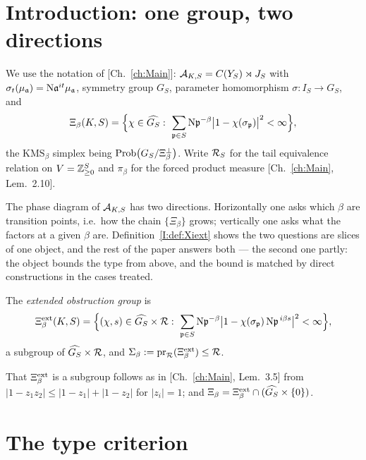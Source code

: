\section{Introduction: one group, two directions}

We use the notation of [Ch.~\ref{ch:Main}]: $\mathcal{A}_{K,S}=C(Y_S)\rtimes J_S$ with
$\sigma_t(\mu_{\mathfrak{a}})=\mathrm{N}\mathfrak{a}^{it}\mu_{\mathfrak{a}}$, symmetry group $G_S$, parameter homomorphism
$\sigma:I_S\to G_S$, and
\begin{equation}\label{I:eq:Xi}
\Xi_\beta(K,S)=\Bigl\{\chi\in\widehat{G_S}:\ \sum_{\mathfrak{p}\in S}\mathrm{N}\mathfrak{p}^{-\beta}\bigl|1-\chi(\sigma_{\mathfrak{p}})\bigr|^2<\infty\Bigr\},
\end{equation}
the $\mathrm{KMS}_\beta$ simplex being $\mathrm{Prob}\bigl(G_S/\Xi_\beta^\perp\bigr)$. Write
$\mathcal{R}_S$ for the tail equivalence relation on $V=\mathbb{Z}_{\ge0}^S$ and $\pi_\beta$ for the forced
product measure [Ch.~\ref{ch:Main}, Lem.~2.10].

The phase diagram of $\mathcal{A}_{K,S}$ has two directions. Horizontally one asks which
$\beta$ are transition points, i.e.\ how the chain $\{\Xi_\beta\}$ grows; vertically one asks
what the factors at a given $\beta$ are. Definition~\ref{I:def:Xiext} shows the two questions
are slices of one object, and the rest of the paper answers both --- the second one
partly: the object bounds the type from above, and the bound is matched by direct
constructions in the cases treated.

\begin{definition}\label{I:def:Xiext}
The \emph{extended obstruction group} is
\begin{equation}\label{I:eq:Xiext}
\Xi^{\mathrm{ext}}_\beta(K,S)=\Bigl\{(\chi,s)\in\widehat{G_S}\times\mathcal{R}:\
\sum_{\mathfrak{p}\in S}\mathrm{N}\mathfrak{p}^{-\beta}\bigl|1-\chi(\sigma_{\mathfrak{p}})\,\mathrm{N}\mathfrak{p}^{\,i\beta s}\bigr|^2<\infty\Bigr\},
\end{equation}
a subgroup of $\widehat{G_S}\times\mathcal{R}$, and $\Sigma_\beta:=\mathrm{pr}_{\mathcal{R}}(\Xi^{\mathrm{ext}}_\beta)\le\mathcal{R}$.
\end{definition}

That $\Xi^{\mathrm{ext}}_\beta$ is a subgroup follows as in [Ch.~\ref{ch:Main}, Lem.~3.5] from
$|1-z_1z_2|\le|1-z_1|+|1-z_2|$ for $|z_i|=1$; and $\Xi_\beta=\Xi^{\mathrm{ext}}_\beta\cap(\widehat{G_S}\times\{0\})$.

\section{The type criterion}\label{I:sec:type}

